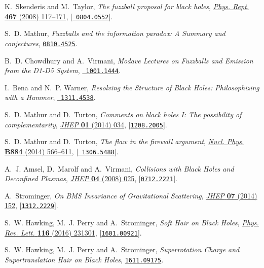 \documentclass[12pt]{article}
\begin{document}
\begin{thebibliography}{100}
K.~Skenderis and M.~Taylor, \emph{{The fuzzball proposal for black holes}},
  \href{http://dx.doi.org/10.1016/j.physrep.2008.08.001}{\emph{Phys. Rept.}
  {\bf 467} (2008) 117--171}, [\href{http://arxiv.org/abs/0804.0552}{{\tt
  0804.0552}}].

S.~D. Mathur, \emph{{Fuzzballs and the information paradox: A Summary and
  conjectures}},  \href{http://arxiv.org/abs/0810.4525}{{\tt 0810.4525}}.

B.~D. Chowdhury and A.~Virmani, \emph{{Modave Lectures on Fuzzballs and
  Emission from the D1-D5 System}},  \href{http://arxiv.org/abs/1001.1444}{{\tt
  1001.1444}}.

I.~Bena and N.~P. Warner, \emph{{Resolving the Structure of Black Holes:
  Philosophizing with a Hammer}},  \href{http://arxiv.org/abs/1311.4538}{{\tt
  1311.4538}}.

S.~D. Mathur and D.~Turton, \emph{{Comments on black holes I: The possibility
  of complementarity}},
  \href{http://dx.doi.org/10.1007/JHEP01(2014)034}{\emph{JHEP} {\bf 01} (2014)
  034}, [\href{http://arxiv.org/abs/1208.2005}{{\tt 1208.2005}}].

S.~D. Mathur and D.~Turton, \emph{{The flaw in the firewall argument}},
  \href{http://dx.doi.org/10.1016/j.nuclphysb.2014.05.012}{\emph{Nucl. Phys.}
  {\bf B884} (2014) 566--611}, [\href{http://arxiv.org/abs/1306.5488}{{\tt
  1306.5488}}].

A.~J. Amsel, D.~Marolf and A.~Virmani, \emph{{Collisions with Black Holes and
  Deconfined Plasmas}},
  \href{http://dx.doi.org/10.1088/1126-6708/2008/04/025}{\emph{JHEP} {\bf 04}
  (2008) 025}, [\href{http://arxiv.org/abs/0712.2221}{{\tt 0712.2221}}].

A.~Strominger, \emph{{On BMS Invariance of Gravitational Scattering}},
  \href{http://dx.doi.org/10.1007/JHEP07(2014)152}{\emph{JHEP} {\bf 07} (2014)
  152}, [\href{http://arxiv.org/abs/1312.2229}{{\tt 1312.2229}}].

S.~W. Hawking, M.~J. Perry and A.~Strominger, \emph{{Soft Hair on Black
  Holes}}, \href{http://dx.doi.org/10.1103/PhysRevLett.116.231301}{\emph{Phys.
  Rev. Lett.} {\bf 116} (2016) 231301},
  [\href{http://arxiv.org/abs/1601.00921}{{\tt 1601.00921}}].

S.~W. Hawking, M.~J. Perry and A.~Strominger, \emph{{Superrotation Charge and
  Supertranslation Hair on Black Holes}},
  \href{http://arxiv.org/abs/1611.09175}{{\tt 1611.09175}}.


\end{thebibliography}
\end{document}
